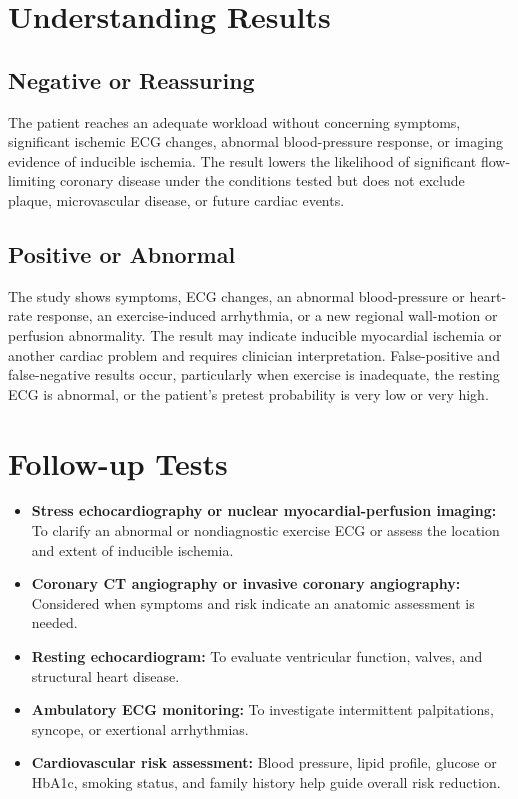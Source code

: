 \section*{Understanding Results}

\subsection*{Negative or Reassuring}
The patient reaches an adequate workload without concerning symptoms, significant ischemic ECG changes, abnormal blood-pressure response, or imaging evidence of inducible ischemia. The result lowers the likelihood of significant flow-limiting coronary disease under the conditions tested but does not exclude plaque, microvascular disease, or future cardiac events.

\subsection*{Positive or Abnormal}
The study shows symptoms, ECG changes, an abnormal blood-pressure or heart-rate response, an exercise-induced arrhythmia, or a new regional wall-motion or perfusion abnormality. The result may indicate inducible myocardial ischemia or another cardiac problem and requires clinician interpretation. False-positive and false-negative results occur, particularly when exercise is inadequate, the resting ECG is abnormal, or the patient's pretest probability is very low or very high.

\section*{Follow-up Tests}
\begin{itemize}
  \item \textbf{Stress echocardiography or nuclear myocardial-perfusion imaging:} To clarify an abnormal or nondiagnostic exercise ECG or assess the location and extent of inducible ischemia.
  \item \textbf{Coronary CT angiography or invasive coronary angiography:} Considered when symptoms and risk indicate an anatomic assessment is needed.
  \item \textbf{Resting echocardiogram:} To evaluate ventricular function, valves, and structural heart disease.
  \item \textbf{Ambulatory ECG monitoring:} To investigate intermittent palpitations, syncope, or exertional arrhythmias.
  \item \textbf{Cardiovascular risk assessment:} Blood pressure, lipid profile, glucose or HbA1c, smoking status, and family history help guide overall risk reduction.
\end{itemize}

